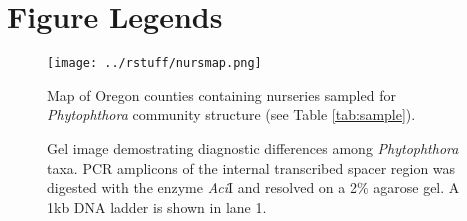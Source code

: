 \documentclass[12pt]{article}
\begin{document}
\renewcommand\refname{Literature Cited}


\clearpage

\section*{Figure Legends}






\begin{figure}[!ht]
\begin{center}
\texttt{[image: ../rstuff/nursmap.png]}
\end{center}
\caption{
Map of Oregon counties containing nurseries sampled for \emph{Phytophthora} community structure (see Table \ref{tab:sample}).
}
\label{fig:map}
\end{figure}
\clearpage

\begin{figure}[!ht]
\begin{center}
\end{center}
\caption{
Gel image demostrating diagnostic differences among \emph{Phytophthora} taxa. PCR amplicons of the internal transcribed spacer region was digested with the enzyme \emph{Aci}I and resolved on a 2\% agarose gel.  A 1kb DNA ladder is shown in lane 1.
}
\label{fig:gel}
\end{figure}
\clearpage
\end{document}
